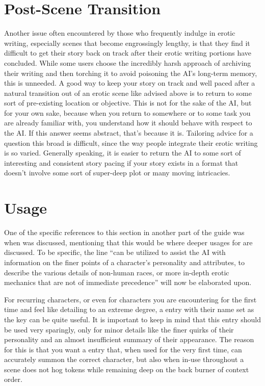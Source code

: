 \documentclass[Coomer-main.tex]{subfiles}
\begin{document}
\section{Post-Scene Transition}
\label{subsec:p-stransition}

Another issue often encountered by those who frequently indulge in erotic writing, especially scenes that become engrossingly lengthy, is that they find it difficult to get their story back on track after their erotic writing portions have concluded.
While some users choose the incredibly harsh approach of archiving their writing and then torching it to avoid poisoning the AI’s long-term memory, this is unneeded.
A good way to keep your story on track and well paced after a natural transition out of an erotic scene like advised above is to return to some sort of pre-existing location or objective.
This is not for the sake of the AI, but for your own sake, because when you return to somewhere or to some task you are already familiar with, you understand how it should behave with respect to the AI.
If this answer seems abstract, that’s because it is.
Tailoring advice for a question this broad is difficult, since the way people integrate their erotic writing is so varied.
Generally speaking, it is easier to return the AI to some sort of interesting and consistent story pacing if your story exists in a format that doesn’t involve some sort of super-deep plot or many moving intricacies.

\section{\wi Usage}
\label{sec:wiusage}

One of the specific references to this section in another part of the guide was when \wi was discussed, mentioning that this would be where deeper usages for \wi are discussed.
To be specific, the line “\wi can be utilized to assist the AI with information on the finer points of a character’s personality and attributes, to describe the various details of non-human races, or more in-depth erotic mechanics that are not of immediate precedence” will now be elaborated upon.

For recurring characters, or even for characters you are encountering for the first time and feel like detailing to an extreme degree, a \wi entry with their name set as the key can be quite useful.
It is important to keep in mind that this entry should be used very sparingly, only for minor details like the finer quirks of their personality and an almost insufficient summary of their appearance.
The reason for this is that you want a \wi entry that, when used for the very first time, can accurately summon the correct character, but also when in-use throughout a scene does not hog tokens while remaining deep on the back burner of context order.
\end{document}
